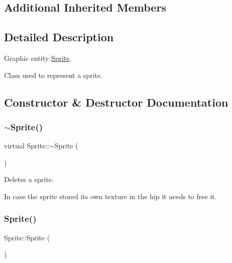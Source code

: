 \subsection*{Additional Inherited Members}


\subsection{Detailed Description}
Graphic entity \hyperlink{class_sprite}{Sprite}. 

Class used to represent a sprite. 

\subsection{Constructor \& Destructor Documentation}
\mbox{\label{class_sprite_aff0448963fc0515aad87ac0cce6f8bc2}} 
\subsubsection{\texorpdfstring{$\sim$\+Sprite()}{~Sprite()}}
{\footnotesize\ttfamily virtual Sprite\+::$\sim$\+Sprite (\begin{DoxyParamCaption}{ }\end{DoxyParamCaption})\hspace{0.3cm}{\ttfamily [virtual]}}



Deletes a sprite. 

In case the sprite stored it\textquotesingle{}s own texture in the hip it needs to free it. \mbox{\label{class_sprite_a12cba3ac1868418add3c4d95ce87e615}} 
\subsubsection{\texorpdfstring{Sprite()}{Sprite()}\hspace{0.1cm}{\footnotesize\ttfamily [1/2]}}
{\footnotesize\ttfamily Sprite\+::\+Sprite (\begin{DoxyParamCaption}{ }\end{DoxyParamCaption})\hspace{0.3cm}{\ttfamily [protected]}}



